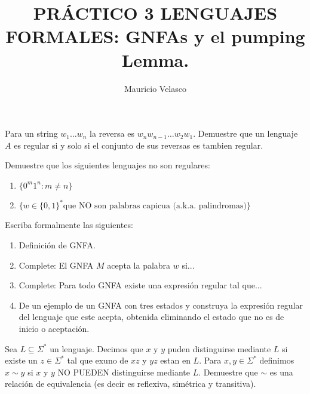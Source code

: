 \documentclass[12pt, a4paper]{article}
\date{}
\begin{document}
\title{PRÁCTICO 3 LENGUAJES FORMALES: GNFAs y el pumping Lemma.}
\author{Mauricio Velasco}
\maketitle{}


\item Para un string $w_1\dots w_n$ la reversa es $w_nw_{n-1}\dots w_2w_1$. Demuestre que un lenguaje $A$ es regular si y solo si el conjunto de sus reversas es tambien regular.

\item Demuestre que los siguientes lenguajes no son regulares:
\begin{enumerate}
\item $\{0^m1^n: m\neq n\}$
\item $\{w\in \{0,1\}^* \text{que NO son palabras capicua (a.k.a. palindromas)}\}$
\end{enumerate}

\item Escriba formalmente las siguientes:
\begin{enumerate}
\item Definición de GNFA.
\item Complete: El GNFA $M$ acepta la palabra $w$ si...
\item Complete: Para todo GNFA existe una expresión regular tal que...
\item De un ejemplo de un GNFA con tres estados y construya la expresión regular del lenguaje que este acepta, obtenida eliminando el estado que no es de inicio o aceptación.
\end{enumerate}


\item Sea $L\subseteq \Sigma^*$ un lenguaje. Decimos que $x$ y $y$ puden distinguirse mediante $L$ si existe un $z\in \Sigma^*$ tal que ex uno de $xz$ y $yz$ estan en $L$. Para $x,y\in \Sigma^*$ definimos $x\sim y$ si $x$ y $y$ NO PUEDEN distinguirse mediante $L$. Demuestre que $\sim$ es una relación de equivalencia (es decir es reflexiva, simétrica y transitiva).
\end{document}
